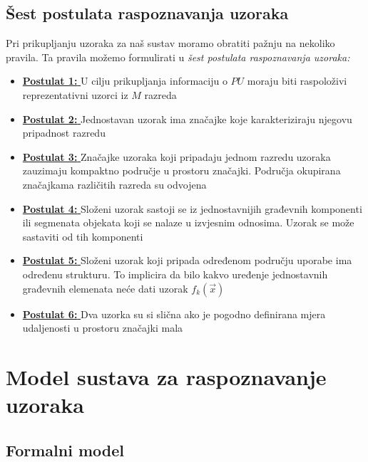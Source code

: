 \documentclass{book}
\begin{document}
\section{Šest postulata raspoznavanja uzoraka}

 Pri prikupljanju uzoraka za naš sustav moramo obratiti pažnju na nekoliko
pravila. Ta pravila možemo formulirati u \textit{šest postulata raspoznavanja
uzoraka: } \\
\begin{itemize}
  \item \underline{\textbf{Postulat 1: }} U cilju prikupljanja informaciju o
  $PU$ moraju biti raspoloživi reprezentativni uzorci iz $M$ razreda
  \item \underline{\textbf{Postulat 2: }} Jednostavan uzorak ima značajke koje
  karakteriziraju njegovu pripadnost razredu
  \item \underline{\textbf{Postulat 3: }} Značajke uzoraka koji pripadaju
  jednom razredu uzoraka zauzimaju kompaktno područje u prostoru značajki.
  Područja okupirana značajkama različitih razreda su odvojena
  \item \underline{\textbf{Postulat 4: }} Složeni uzorak sastoji se iz
  jednostavnijih građevnih komponenti ili segmenata objekata koji se nalaze u
  izvjesnim odnosima. Uzorak se može sastaviti od tih komponenti
  \item \underline{\textbf{Postulat 5: }} Složeni uzorak koji pripada određenom
  području uporabe ima određenu strukturu. To implicira da bilo kakvo uređenje
  jednostavnih građevnih elemenata neće dati uzorak $f_k(\vec{x})$
  \item \underline{\textbf{Postulat 6: }} Dva uzorka su si slična ako je pogodno
  definirana mjera udaljenosti u prostoru značajki mala
\end{itemize}







\chapter{Model sustava za raspoznavanje uzoraka}

\section{Formalni model}
\end{document}
